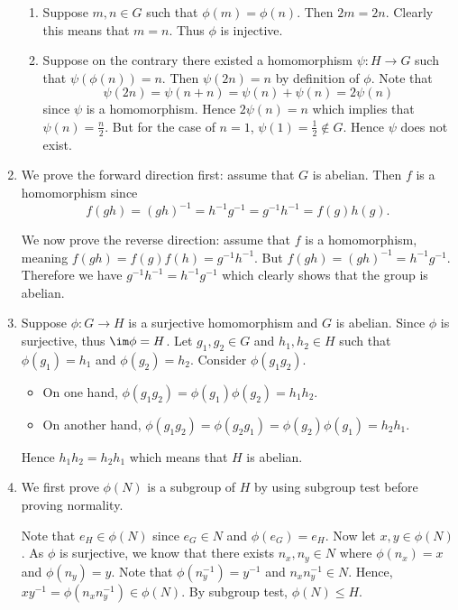 \begin{enumerate}
\begin{enumerate}[label=(\alph*)]
        \item Suppose $m, n \in G$ such that $\phi(m) = \phi(n)$. Then $2m = 2n$. Clearly this means that $m = n$. Thus $\phi$ is injective.

        \item Suppose on the contrary there existed a homomorphism $\psi: H \to G$ such that $\psi(\phi(n)) = n$. Then $\psi(2n) = n$ by definition of $\phi$. Note that
        \[
            \psi(2n) = \psi(n + n) = \psi(n) + \psi(n) = 2\psi(n)
        \]
        since $\psi$ is a homomorphism. Hence $2\psi(n) = n$ which implies that $\psi(n) = \frac n2$. But for the case of $n = 1$, $\psi(1) = \frac 12 \notin G$. Hence $\psi$ does not exist.
    \end{enumerate}

    \item We prove the forward direction first: assume that $G$ is abelian. Then $f$ is a homomorphism since
    \[
        f(gh) = (gh)^{-1} = h^{-1}g^{-1} = g^{-1}h^{-1} = f(g)h(g).
    \]

    We now prove the reverse direction: assume that $f$ is a homomorphism, meaning $f(gh) = f(g)f(h) = g^{-1}h^{-1}$. But $f(gh) = (gh)^{-1} = h^{-1}g^{-1}$. Therefore we have $g^{-1}h^{-1} = h^{-1}g^{-1}$ which clearly shows that the group is abelian.

    \item Suppose $\phi: G \to H$ is a surjective homomorphism and $G$ is abelian. Since $\phi$ is surjective, thus $\im \phi = H$. Let $g_1, g_2 \in G$ and $h_1, h_2 \in H$ such that $\phi(g_1) = h_1$ and $\phi(g_2) = h_2$. Consider $\phi(g_1g_2)$.
    \begin{itemize}
        \item On one hand, $\phi(g_1g_2) = \phi(g_1)\phi(g_2) = h_1h_2$.
        \item On another hand, $\phi(g_1g_2) = \phi(g_2g_1) = \phi(g_2)\phi(g_1) = h_2h_1$.
    \end{itemize}
    Hence $h_1h_2 = h_2h_1$ which means that $H$ is abelian.

    \item We first prove $\phi(N)$ is a subgroup of $H$ by using subgroup test before proving normality.

    Note that $e_H \in \phi(N)$ since $e_G \in N$ and $\phi(e_G) = e_H$. Now let $x, y \in \phi(N)$. As $\phi$ is surjective, we know that there exists $n_x, n_y \in N$ where $\phi(n_x) = x$ and $\phi(n_y) = y$. Note that $\phi(n_y^{-1}) = y^{-1}$ and $n_xn_y^{-1} \in N$. Hence, $xy^{-1} = \phi(n_xn_y^{-1}) \in \phi(N)$. By subgroup test, $\phi(N) \leq H$.


\end{enumerate}
